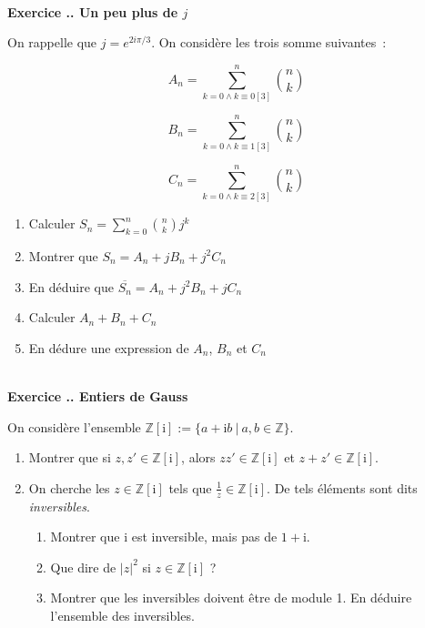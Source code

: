 \documentclass{article}
\newcommand{\mb}[1]{\mathbb{#1}}
\newcounter{exo}
\newcommand{\exercice}[1][\null]{\textbf{\\ \large Exercice \thesection.\theexo. \normalsize #1} \addtocounter{exo}{1}}
\begin{document}
\exercice[Un peu plus de $j$]

On rappelle que $j = e^{2i\pi /3}$.
On considère les trois somme suivantes~:

\begin{equation*}
    A_n = \sum_{k = 0 \wedge k \equiv 0 [3]}^{n} { n \choose k} 
\end{equation*}

\begin{equation*}
    B_n = \sum_{k = 0 \wedge k \equiv 1 [3]}^{n} { n \choose k} 
\end{equation*}

\begin{equation*}
    C_n = \sum_{k = 0 \wedge k \equiv 2 [3]}^{n} { n \choose k} 
\end{equation*}

\begin{enumerate}
    \item Calculer $S_n = \sum_{k = 0}^n { n \choose k } j^k$
    \item Montrer que $S_n = A_n + j B_n + j^2 C_n$
    \item En déduire que $\overline{S_n} = A_n + j^2 B_n + jC_n$
    \item Calculer $A_n + B_n + C_n$
    \item En dédure une expression de $A_n$, $B_n$ et $C_n$
\end{enumerate}


\exercice[Entiers de Gauss]

On considère l'ensemble $\mb{Z}[\text{i}] := \{a + \text{i}b~|~a, b \in \mb{Z}\}$.

\begin{enumerate}

\item Montrer que si $z, z' \in \mb{Z}[\text{i}]$, alors $zz' \in \mb{Z}[\text{i}]$ et $z+z' \in \mb{Z}[\text{i}]$.

\item On cherche les $z \in \mb{Z}[\text{i}] $ tels que $ \frac{1}{z} \in \mb{Z}[\text{i}]$. De tels éléments sont dits \emph{inversibles}.

\begin{enumerate}

\item Montrer que $\text{i}$ est inversible, mais pas de $1+ \text{i}$.

\item Que dire de $|z|^2$ si $z \in \mb{Z}[\text{i}]$ ?

\item Montrer que les inversibles doivent être de module 1. En déduire l'ensemble des inversibles.


\end{enumerate}


\end{enumerate}
\end{document}
